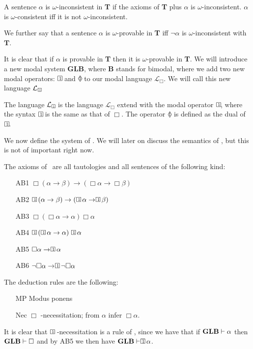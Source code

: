 \documentclass[../main.tex]{subfiles}
\begin{document}
\begin{defi}
	A sentence $\alpha$ is $\omega$-inconsistent in \textbf{T} if the
	axioms of \textbf{T} plus $\alpha$ is $\omega$-inconsistent. $\alpha$
	is $\omega$-consistent iff it is not $\omega$-inconsistent.

	We further say that a sentence $\alpha$ is $\omega$-provable in
	\textbf{T} iff $\neg\alpha$ is $\omega$-inconsistent with $\textbf{T}$.
\end{defi}
It is clear that if $\alpha$ is provable in \textbf{T} then it is
$\omega$-provable in \textbf{T}. We will introduce a new modal system
$\textbf{GLB}$, where \textbf{B} stands for bimodal, where we add two new modal
operators: $\OneBox$ and $\OneDiamond$ to our modal language
$\mathcal{L}_\Box$. We will call this new language $\mathcal{L}_{\oneBox}$
\begin{defi}
	The language $\mathcal{L}_{\oneBox}$ is the language $\mathcal{L}_\Box$
	extend with the modal operator $\OneBox$, where the syntax $\OneBox$ is
	the same as that of $\Box$. The operator $\OneDiamond$ is defined as
	the dual of $\OneBox$.
\end{defi}
We now define the system of \GLB. We will later on discuss the semantics of
\GLB, but this is not of important right now.

\begin{defi}
	The axioms of \GLB\ are all tautologies and all sentences of the
	following kind:
	\begin{enumerate}
		\item[AB1]
			$\Box(\alpha\rightarrow\beta)\rightarrow(\Box\alpha\rightarrow\Box\beta)$
		\item[AB2]
			$\OneBox(\alpha\rightarrow\beta)\rightarrow(\OneBox\alpha\rightarrow\OneBox\beta)$
		\item[AB3] $\Box(\Box\alpha\rightarrow\alpha)\Box\alpha$
		\item[AB4] $\OneBox(\OneBox\alpha\rightarrow\alpha)\OneBox\alpha$
		\item[AB5] $\Box\alpha\rightarrow\OneBox\alpha$
		\item[AB6] $\neg\Box\alpha\rightarrow\OneBox\neg\Box\alpha$
	\end{enumerate}
	The deduction rules are the following:
	\begin{enumerate}
		\item[MP] Modus ponens
		\item[Nec] $\Box$  -necessitation; from $\alpha$ infer
			$\Box\alpha$.
	\end{enumerate}
\end{defi}
It is clear that $\OneBox$ -necessitation is a rule of \GLB, since we have that
if $\text{\textbf{GLB}}\vdash\alpha$ then $\text{\textbf{GLB}}\vdash\Box$ and by AB5 we then have
$\GLB\vdash\OneBox\alpha$.
\end{document}
